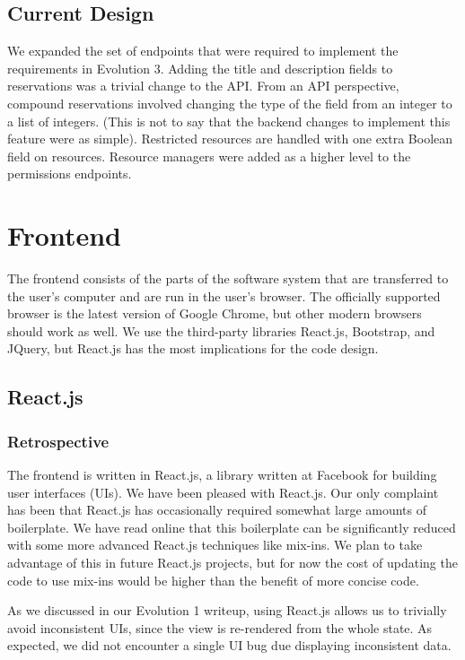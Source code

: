 \documentclass[12pt]{article}
\begin{document}
\subsection{Current Design}
We expanded the set of endpoints that were required to implement the requirements in Evolution 3. Adding the title and description fields to reservations was a trivial change to the API. From an API perspective, compound reservations involved changing the type of the field from an integer to a list of integers. (This is not to say that the backend changes to implement this feature were as simple). Restricted resources are handled with one extra Boolean field on resources. Resource managers were added as a higher level to the permissions endpoints.

\section{Frontend}
\label{sec:Frontend}
The frontend consists of the parts of the software system that are transferred to the user's computer and are run in the user's browser. The officially supported browser is the latest version of Google Chrome, but other modern browsers should work as well. We use the third-party libraries React.js, Bootstrap, and JQuery, but React.js has the most implications for the code design.

\subsection{React.js}
\subsubsection{Retrospective}
The frontend is written in React.js, a library written at Facebook for building user interfaces (UIs). We have been pleased with React.js. Our only complaint has been that React.js has occasionally required somewhat large amounts of boilerplate. We have read online that this boilerplate can be significantly reduced with some more advanced React.js techniques like mix-ins. We plan to take advantage of this in future React.js projects, but for now the cost of updating the code to use mix-ins would be higher than the benefit of more concise code.

As we discussed in our Evolution 1 writeup, using React.js allows us to trivially avoid inconsistent UIs, since the view is re-rendered from the whole state. As expected, we did not encounter a single UI bug due displaying inconsistent data.
\end{document}

